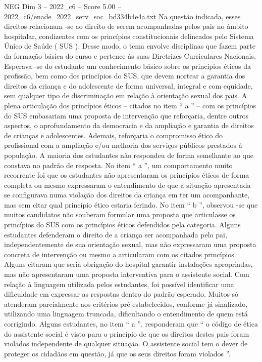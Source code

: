 \begin{textsample}{NEG Dim 3 – 2022\_c6 – Score 5.00 – 2022\_c6/enade\_2022\_serv\_soc\_bd334b4e4a.txt}
Na questão indicada, esses direitos relacionam -se ao direito de serem acompanhadas pelos pais no âmbito hospitalar, condizentes com os princípios constitucionais delineados pelo Sistema Único de Saúde ( SUS ).
Desse modo, o tema envolve disciplinas que fazem parte da formação básica do curso e pertence às suas Diretrizes Curriculares Nacionais.
Esperava -se do estudante um conhecimento básico sobre os princípios éticos da profissão, bem como dos princípios do SUS, que devem nortear a garantia dos direitos da criança e do adolescente de forma universal, integral e com equidade, sem qualquer tipo de discriminação em relação à orientação sexual dos pais.
A plena articulação dos princípios éticos – citados no item “ a ” – com os princípios do SUS embasariam uma proposta de intervenção que reforçaria, dentre outros aspectos, o aprofundamento da democracia e da ampliação e garantia de direitos de crianças e adolescentes.
Ademais, reforçaria o compromisso ético do profissional com a ampliação e/ou melhoria dos serviços públicos prestados à população.
A maioria dos estudantes não respondeu de forma semelhante ao que constava no padrão de resposta.
No item “ a ”, um comportamento muito recorrente foi que os estudantes não apresentaram os princípios éticos de forma completa ou mesmo expressaram o entendimento de que a situação apresentada se configurava numa violação dos direitos da criança em ter um acompanhante, mas sem citar qual princípio ético estaria ferindo.
No item “ b ”, observou -se que muitos candidatos não souberam formular uma proposta que articulasse os princípios do SUS com os princípios éticos defendidos pela categoria.
Alguns estudantes defenderam o direito de a criança ser acompanhada pelo pai, independentemente de sua orientação sexual, mas não expressaram uma proposta concreta de intervenção ou mesmo a articularam com os citados princípios.
Alguns citaram que seria obrigação do hospital garantir instalações apropriadas, mas não apresentaram uma proposta interventiva para o assistente social.
Com relação à linguagem utilizada pelos estudantes, foi possível identificar uma dificuldade em expressar as respostas dentro do padrão esperado.
Muitos só atenderam parcialmente aos critérios pré-estabelecidos, conforme já sinalizado, utilizando uma linguagem truncada, dificultando o entendimento de quem está corrigindo.
Alguns estudantes, no item “ a ”, responderam que “ o código de ética do assistente social é visto para o princípio de que os direitos destes pais foram violados independente de qualquer situação.
O assistente social tem o dever de proteger os cidadãos em questão, já que os seus direitos foram violados ”.

\end{textsample}
